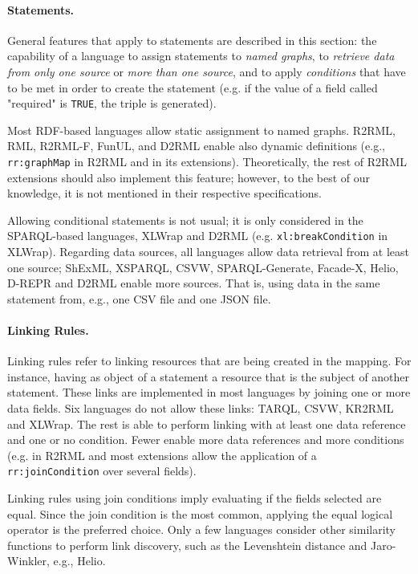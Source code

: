 \noindent\paragraph{\textbf{Statements.}} General features that apply to statements are described in this section: the capability of a language to assign statements to \textit{named graphs}, to \textit{retrieve data from only one source} or \textit{more than one source}, and to apply \textit{conditions} that have to be met in order to create the statement (e.g. if the value of a field called "required" is \texttt{TRUE}, the triple is generated).

Most RDF-based languages allow static assignment to named graphs. R2RML, RML, R2RML-F, FunUL, and D2RML enable also dynamic definitions (e.g., \texttt{rr:graph\-Map} in R2RML and in its extensions). Theoretically, the rest of R2RML extensions should also implement this feature; however, to the best of our knowledge, it is not mentioned in their respective specifications. 

Allowing conditional statements is not usual; it is only considered in the SPARQL-based languages, XLWrap and D2RML (e.g. \texttt{xl:breakCo\-ndition} in XLWrap). Regarding data sources, all languages allow data retrieval from at least one source; ShExML, XSPARQL, CSVW, SPARQL-Generate, Facade-X, Helio, D-REPR and D2RML enable more sources. That is, using data in the same statement from, e.g., one CSV file and one JSON file.


\noindent\paragraph{\textbf{Linking Rules.}} Linking rules refer to linking resources that are being created in the mapping. For instance, having as object of a statement a resource that is the subject of another statement. These links are implemented in most languages by joining one or more data fields. Six languages do not allow these links: TARQL, CSVW, KR2RML and XLWrap. The rest is able to perform linking with at least one data reference and one or no condition. Fewer enable more data references and more conditions (e.g. in R2RML and most extensions allow the application of a \texttt{rr:joinCondition} over several fields). 

Linking rules using join conditions imply evaluating if the fields selected are equal. Since the join condition is the most common, applying the equal logical operator is the preferred choice. Only a few languages consider other similarity functions to perform link discovery, such as the Levenshtein distance and Jaro-Winkler, e.g., Helio. %




